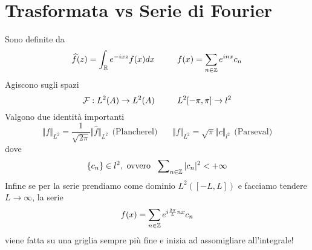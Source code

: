 \section{Trasformata vs Serie di Fourier}

Sono definite da
\begin{equation*}
\widehat{f}(z) = \int_{\mathbb{R}} e^{- ixz} f(x) dx\ \ \ \ \ \ \ \ f(x) = \sum_{n\in \mathbb{Z}} e^{inx} c_{n}
\end{equation*}
Agiscono sugli spazi
\begin{equation*}
\mathcal{F} : L^{2}(A)\rightarrow L^{2}(A) \ \ \ \ \ \ \ \ L^{2}[- \pi, \pi]\rightarrow l^{2}
\end{equation*}
Valgono due identità importanti
\begin{equation*}
\Vert f \Vert_{L^{2}} = \frac{1}{\sqrt{2\pi}} \Vert \hat{f} \Vert_{L^{2}} \ \ \text{(Plancherel)} \ \ \ \ \ \ \ \ \Vert f \Vert_{L^{2}} = \sqrt{\pi} \Vert c \Vert_{l^{2}} \ \ \text{(Parseval)}
\end{equation*}
dove
\begin{equation*}
\{c_{n}\} \in l^{2}, \ \text{ovvero} \ \ \sum\nolimits_{n\in \ZZ}| c_{n}|^{2} < + \infty
\end{equation*}
Infine se per la serie prendiamo come dominio $L^{2}([- L, L])$ e facciamo tendere $L\rightarrow \infty $, la serie
\begin{equation*}
f(x) = \sum_{n\in \mathbb{Z}} e^{i\frac{2\pi}{L} nx} c_{n}
\end{equation*}
viene fatta su una griglia sempre più fine e inizia ad assomigliare all'integrale!

